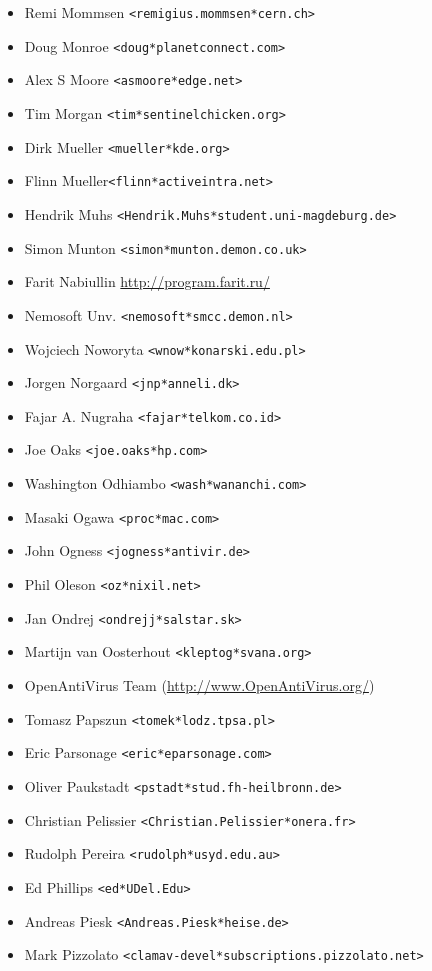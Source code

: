 \documentclass[a4paper,titlepage,12pt]{article}
\newcommand{\email}[1]{\texttt{#1}}
\begin{document}
\begin{itemize}
	\item Remi Mommsen \email{<remigius.mommsen*cern.ch>}
	\item Doug Monroe \email{<doug*planetconnect.com>}
	\item Alex S Moore \email{<asmoore*edge.net>}
	\item Tim Morgan \email{<tim*sentinelchicken.org>}
	\item Dirk Mueller \email{<mueller*kde.org>}
	\item Flinn Mueller\email{<flinn*activeintra.net>}
	\item Hendrik Muhs \email{<Hendrik.Muhs*student.uni-magdeburg.de>}
	\item Simon Munton \email{<simon*munton.demon.co.uk>}
	\item Farit Nabiullin \url{http://program.farit.ru/}
	\item Nemosoft Unv. \email{<nemosoft*smcc.demon.nl>}
	\item Wojciech Noworyta \email{<wnow*konarski.edu.pl>}
	\item Jorgen Norgaard \email{<jnp*anneli.dk>}
	\item Fajar A. Nugraha \email{<fajar*telkom.co.id>}
	\item Joe Oaks \email{<joe.oaks*hp.com>}
	\item Washington Odhiambo \email{<wash*wananchi.com>}
	\item Masaki Ogawa \email{<proc*mac.com>}
	\item John Ogness \email{<jogness*antivir.de>}
	\item Phil Oleson \email{<oz*nixil.net>}
	\item Jan Ondrej \email{<ondrejj*salstar.sk>}
	\item Martijn van Oosterhout \email{<kleptog*svana.org>}
	\item OpenAntiVirus Team (\url{http://www.OpenAntiVirus.org/})
	\item Tomasz Papszun \email{<tomek*lodz.tpsa.pl>}
	\item Eric Parsonage \email{<eric*eparsonage.com>}
	\item Oliver Paukstadt \email{<pstadt*stud.fh-heilbronn.de>}
	\item Christian Pelissier \email{<Christian.Pelissier*onera.fr>}
	\item Rudolph Pereira \email{<rudolph*usyd.edu.au>}
	\item Ed Phillips \email{<ed*UDel.Edu>}
	\item Andreas Piesk \email{<Andreas.Piesk*heise.de>}
	\item Mark Pizzolato \email{<clamav-devel*subscriptions.pizzolato.net>}

\end{itemize}
\end{document}
